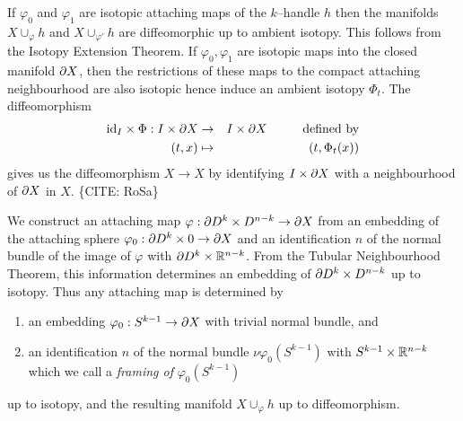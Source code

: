 \begin{rmk}
If $\varphi_0$ and $\varphi_1$ are isotopic attaching maps of the $k$--handle $h$ then the manifolds $X\cup_\varphi h$ and $X\cup_{\varphi'} h$ are diffeomorphic up to ambient isotopy.
This follows from the Isotopy Extension Theorem.
If $\varphi_0,\varphi_1$ are isotopic maps into the closed manifold $\partial X$, then the restrictions of these maps to the compact attaching neighbourhood are also isotopic hence induce an ambient isotopy $\Phi_t$.
The diffeomorphism
\begin{eqnarray*}
  \ident{I}\times \Phi : I\times \pd X 
  & \to &
  I\times \pd X    \text{\hspace{10mm}defined by}  \\
  (t,x)
  & \mapsto &
  (t,\Phi_t(x))
\end{eqnarray*}
gives us the diffeomorphism $X\to X$ by identifying $I\times\partial X$ with a neighbourhood of $\partial X$ in $X$. \{CITE: RoSa\}

We construct an attaching map $\varphi:\partial D^k\times D^{n-k}\to\partial X$ from an embedding of the attaching sphere $\varphi_0:\partial D^k\times 0\to \partial X$ and an identification $n$ of the normal bundle of the image of $\varphi$ with $\partial D^k \times \mathbb{R}^{n-k}$.
From the Tubular Neighbourhood Theorem, this information determines an embedding of $\partial D^k\times D^{n-k}$ up to isotopy.
Thus any attaching map is determined by
\begin{enumerate}
  \item an embedding $\varphi_0:S^{k-1}\to\partial X$ with trivial normal bundle, and
  \item an identification $n$ of the normal bundle $\nu\varphi_0(S^{k-1})$ with $S^{k-1}\times\mathbb{R}^{n-k}$ which we call a \emph{framing of} $\varphi_0(S^{k-1})$
\end{enumerate}
up to isotopy, and the resulting manifold $X\cup_\varphi h$ up to diffeomorphism.
\end{rmk}

